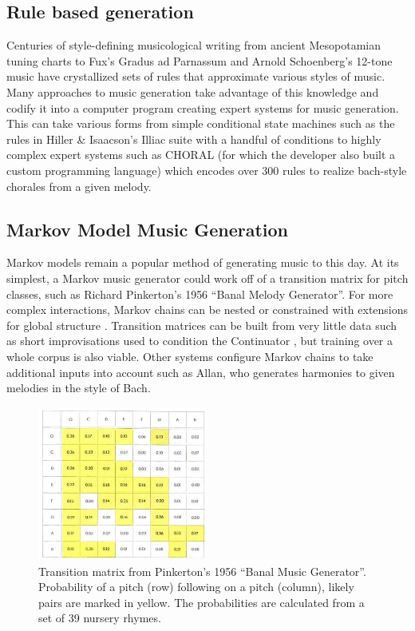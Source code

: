 \subsection{Rule based generation}
Centuries of style-defining musicological writing from ancient Mesopotamian tuning charts \cite{Mirelman_2013} to Fux’s Gradus ad Parnassum \cite{Fux_1725} and Arnold Schoenberg’s 12-tone music have crystallized sets of rules that approximate various styles of music. Many approaches to music generation take advantage of this knowledge and codify it into a computer program creating expert systems for music generation. This can take various forms from simple conditional state machines such as the rules in Hiller \& Isaacson’s Illiac suite with a handful of conditions to highly complex expert systems such as CHORAL \cite{Ebcioğlu_1994} (for which the developer also built a custom programming language) which encodes over 300 rules to realize bach-style chorales from a given melody.  

\subsection{Markov Model Music Generation}
Markov models remain a popular method of generating music to this day. At its simplest, a Markov music generator could work off of a transition matrix for pitch classes, such as Richard Pinkerton’s 1956 “Banal Melody Generator”\cite{Pinkerton_1956}. 
For more complex interactions, Markov chains can be nested or constrained with extensions for global structure \cite{Collins_Laney_2017}. 
Transition matrices can be built from very little data such as short improvisations used to condition the Continuator \cite{Pachet_2003}, but training over a whole corpus is also viable. 
Other systems configure Markov chains to take additional inputs into account such as Allan, \cite{Allan_2002} who generates harmonies to given melodies in the style of Bach. 

\begin{figure}[H]
    \centering
    \includegraphics[width=0.5\textwidth]{IMAGES/PinkertonNurseryRhymes.jpg} 
    \caption{Transition matrix from Pinkerton's 1956 “Banal Music Generator”. Probability of a pitch (row) following on a pitch (column), likely pairs are marked in yellow. The probabilities are calculated from a set of 39 nursery rhymes.}
    \label{fig:pinkertonmatrix}
\end{figure}

